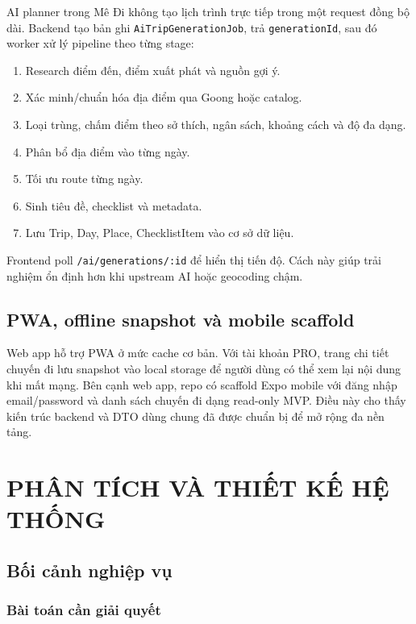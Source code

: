 \documentclass[a4paper]{report}
\newcommand{\ProjectName}{Mê Đi}
\begin{document}
AI planner trong \ProjectName{} không tạo lịch trình trực tiếp trong một request đồng bộ dài. Backend tạo bản ghi \texttt{AiTripGenerationJob}, trả \texttt{generationId}, sau đó worker xử lý pipeline theo từng stage:

\begin{enumerate}
  \item Research điểm đến, điểm xuất phát và nguồn gợi ý.
  \item Xác minh/chuẩn hóa địa điểm qua Goong hoặc catalog.
  \item Loại trùng, chấm điểm theo sở thích, ngân sách, khoảng cách và độ đa dạng.
  \item Phân bổ địa điểm vào từng ngày.
  \item Tối ưu route từng ngày.
  \item Sinh tiêu đề, checklist và metadata.
  \item Lưu Trip, Day, Place, ChecklistItem vào cơ sở dữ liệu.
\end{enumerate}

Frontend poll \texttt{/ai/generations/:id} để hiển thị tiến độ. Cách này giúp trải nghiệm ổn định hơn khi upstream AI hoặc geocoding chậm.

\section{PWA, offline snapshot và mobile scaffold}

Web app hỗ trợ PWA ở mức cache cơ bản. Với tài khoản PRO, trang chi tiết chuyến đi lưu snapshot vào local storage để người dùng có thể xem lại nội dung khi mất mạng. Bên cạnh web app, repo có scaffold Expo mobile với đăng nhập email/password và danh sách chuyến đi dạng read-only MVP. Điều này cho thấy kiến trúc backend và DTO dùng chung đã được chuẩn bị để mở rộng đa nền tảng.

\chapter{PHÂN TÍCH VÀ THIẾT KẾ HỆ THỐNG}

\section{Bối cảnh nghiệp vụ}

\subsection{Bài toán cần giải quyết}
\end{document}
